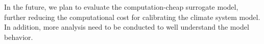 \documentclass[gmd, manuscript]{copernicus}
\begin{document}
In the future, we plan to evaluate the computation-cheap surrogate model, further reducing the computational cost for calibrating the climate system model. In addition, more analysis need to be conducted to well understand the model behavior.
 
















\clearpage

\end{document}
